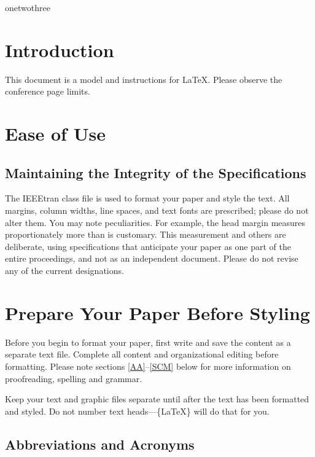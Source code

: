 \documentclass[conference]{IEEEtran}
\begin{document}
\begin{IEEEkeywords}
onetwothree
\end{IEEEkeywords}

\section{Introduction}\label{introduction}

This document is a model and instructions for \LaTeX. Please observe the
conference page limits.

\section{Ease of Use}\label{ease-of-use}

\subsection{Maintaining the Integrity of the
Specifications}\label{maintaining-the-integrity-of-the-specifications}

The IEEEtran class file is used to format your paper and style the text.
All margins, column widths, line spaces, and text fonts are prescribed;
please do not alter them. You may note peculiarities. For example, the
head margin measures proportionately more than is customary. This
measurement and others are deliberate, using specifications that
anticipate your paper as one part of the entire proceedings, and not as
an independent document. Please do not revise any of the current
designations.

\section{Prepare Your Paper Before
Styling}\label{prepare-your-paper-before-styling}

Before you begin to format your paper, first write and save the content
as a separate text file. Complete all content and organizational editing
before formatting. Please note sections \ref{AA}--\ref{SCM} below for
more information on proofreading, spelling and grammar.

Keep your text and graphic files separate until after the text has been
formatted and styled. Do not number text heads---\{\LaTeX\} will do that
for you.

\subsection{Abbreviations and
Acronyms}\label{abbreviations-and-acronyms}
\end{document}
